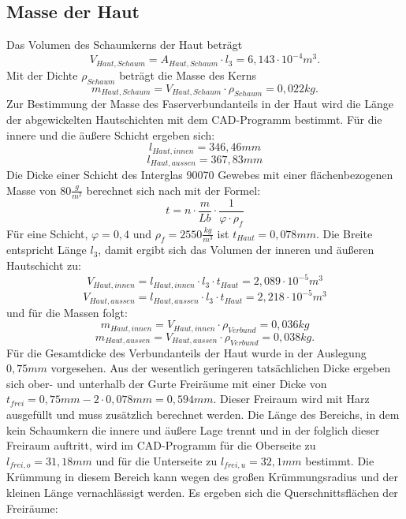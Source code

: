 \subsection{Masse der Haut}
Das Volumen des Schaumkerns der Haut beträgt 
\begin{equation}
	V_{Haut,Schaum}=A_{Haut,Schaum}\cdot l_{3}=6,143\cdot10^{-4}m^{3}.
\end{equation}
Mit der Dichte $ \rho_{Schaum} $ beträgt die Masse des Kerns
\begin{equation}
	m_{Haut,Schaum}=V_{Haut,Schaum}\cdot\rho_{Schaum}=0,022kg.
\end{equation}
Zur Bestimmung der Masse des Faserverbundanteils in der Haut wird die Länge der abgewickelten Hautschichten mit dem CAD-Programm bestimmt. Für die innere und die äußere Schicht ergeben sich:
\begin{equation}
	l_{Haut,innen}=346,46mm
\end{equation}
\begin{equation}
	l_{Haut,aussen}=367,83mm
\end{equation}
Die Dicke einer Schicht des Interglas 90070 Gewebes mit einer flächenbezogenen Masse von $ 80\frac{g}{m^{2}} $
berechnet sich nach \cite{item3} mit der Formel:
\begin{equation}
	t=n\cdot\frac{m}{Lb}\cdot\frac{1}{\varphi\cdot\rho_{f}}
\end{equation}
Für eine Schicht, $ \varphi=0,4 $ und $ \rho_{f}=2550\frac{kg}{m^{3}} $ ist $ t_{Haut}=0,078mm $.
Die Breite entspricht Länge $ l_{3} $, damit ergibt sich das Volumen der inneren und äußeren Hautschicht zu:
\begin{equation}
	V_{Haut,innen}=l_{Haut,innen}\cdot l_{3}\cdot t_{Haut}=2,089\cdot 10^{-5}m^{3}
\end{equation}
\begin{equation}
	V_{Haut,aussen}=l_{Haut,aussen}\cdot l_{3}\cdot t_{Haut}=2,218\cdot 10^{-5}m^{3}
\end{equation}
und für die Massen folgt:
\begin{equation}
	m_{Haut,innen}=V_{Haut,innen}\cdot \rho_{Verbund}=0,036kg
\end{equation}
\begin{equation}
	m_{Haut,aussen}=V_{Haut,aussen}\cdot \rho_{Verbund}=0,038kg.
\end{equation}
Für die Gesamtdicke des Verbundanteils der Haut wurde in der Auslegung $ 0,75mm $ vorgesehen. Aus der wesentlich geringeren tatsächlichen Dicke ergeben sich ober- und unterhalb der Gurte Freiräume mit einer Dicke von $t_{frei}= 0,75mm-2\cdot 0,078mm=0,594mm $. Dieser Freiraum wird mit Harz ausgefüllt und muss zusätzlich berechnet werden. Die Länge des Bereichs, in dem kein Schaumkern die innere und äußere Lage trennt und in der folglich dieser Freiraum auftritt, wird im CAD-Programm für die Oberseite zu $ l_{frei,o}= 31,18mm $ und für die Unterseite zu $ l_{frei,u}=32,1mm $ bestimmt. Die Krümmung in diesem Bereich kann wegen des großen Krümmungsradius und der kleinen Länge vernachlässigt werden. Es ergeben sich die Querschnittsflächen der Freiräume:

